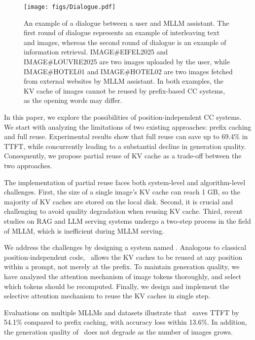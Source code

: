 \begin{figure}
    \centering
    \texttt{[image: figs/Dialogue.pdf]}
    \caption{An example of a dialogue between a user and MLLM assistant. The first round of dialogue represents an example of interleaving text and images, whereas the second round of dialogue is an example of information retrieval. IMAGE\#EIFEL2025 and IMAGE\#LOUVRE2025 are two images uploaded by the user, while IMAGE\#HOTEL01 and IMAGE\#HOTEL02 are two images fetched from external websites by MLLM assistant. In both examples, the KV cache of images cannot be reused by prefix-based CC systems, as the opening words may differ.}
    \label{fig:example}
\end{figure}

In this paper, we explore the possibilities of position-independent CC systems. We start with analyzing the limitations of two existing approaches: prefix caching and full reuse. Experimental results show that full reuse can save up to 69.4\% in TTFT, while concurrently leading to a substantial decline in generation quality. Consequently, we propose partial reuse of KV cache as a trade-off between the two approaches.

The implementation of partial reuse faces both system-level and algorithm-level challenges. First, the size of a single image's KV cache can reach 1 GB, so the majority of KV caches are stored on the local disk. Second, it is crucial and challenging to avoid quality degradation when reusing KV cache. Third, recent studies on RAG and LLM serving systems \cite{gim2024prompt, hu2024epic, yao2024cacheblend} undergo a two-step process in the field of MLLM, which is inefficient during MLLM serving.

We address the challenges by designing a system named \sys. Analogous to classical position-independent code, \sys~allows the KV caches to be reused at any position within a prompt, not merely at the prefix. To maintain generation quality, we have analyzed the attention mechanism of image tokens thoroughly, and select which tokens should be recomputed. Finally, we design and implement the selective attention mechanism to reuse the KV caches in single step.

Evaluations on multiple MLLMs and datasets illustrate that \sys~saves TTFT by 54.1\% compared to prefix caching, with accuracy loss within 13.6\%. In addition, the generation quality of \sys~does not degrade as the number of images grows.

